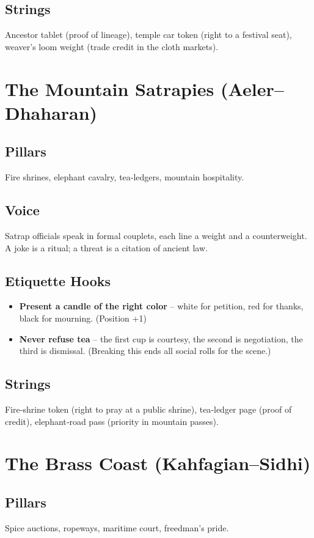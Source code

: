 \documentclass[11pt]{book}
\begin{document}
\subsection*{Strings}
Ancestor tablet (proof of lineage), temple car token (right to a festival seat), weaver's loom weight (trade credit in the cloth markets).

\section{The Mountain Satrapies (Aeler--Dhaharan)}

\subsection*{Pillars}
Fire shrines, elephant cavalry, tea‑ledgers, mountain hospitality.

\subsection*{Voice}
Satrap officials speak in formal couplets, each line a weight and a counterweight. A joke is a ritual; a threat is a citation of ancient law.

\subsection*{Etiquette Hooks}
\begin{itemize}
    \item \textbf{Present a candle of the right color} -- white for petition, red for thanks, black for mourning. (Position +1)
    \item \textbf{Never refuse tea} -- the first cup is courtesy, the second is negotiation, the third is dismissal. (Breaking this ends all social rolls for the scene.)
\end{itemize}

\subsection*{Strings}
Fire‑shrine token (right to pray at a public shrine), tea‑ledger page (proof of credit), elephant‑road pass (priority in mountain passes).

\section{The Brass Coast (Kahfagian--Sidhi)}

\subsection*{Pillars}
Spice auctions, ropeways, maritime court, freedman's pride.
\end{document}
